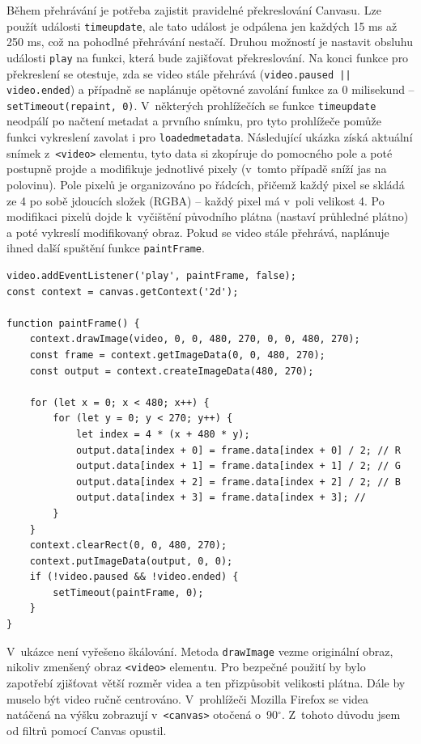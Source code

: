 Během přehrávání je potřeba zajistit pravidelné překreslování Canvasu. Lze použít události \texttt{timeupdate}, ale tato událost je odpálena jen každých 15 ms až 250 ms, což na pohodlné přehrávání nestačí. Druhou možností je nastavit obsluhu události \texttt{play} na funkci, která bude zajišťovat překreslování. Na konci funkce pro překreslení  se otestuje, zda se video stále přehrává (\texttt{video.paused || video.ended}) a případně se naplánuje opětovné zavolání funkce za 0 milisekund -- \texttt{setTimeout(repaint, 0)}. V~některých prohlížečích se funkce \texttt{timeupdate} neodpálí po načtení metadat a prvního snímku, pro tyto prohlížeče pomůže funkci vykreslení zavolat i pro \texttt{loadedmetadata}. Následující ukázka získá aktuální snímek z~\texttt{<video>} elementu, tyto data si zkopíruje do pomocného pole a poté postupně projde a modifikuje jednotlivé pixely (v~tomto případě sníží jas na polovinu). Pole pixelů je organizováno po řádcích, přičemž každý pixel se skládá ze 4 po sobě jdoucích složek (RGBA) -- každý pixel má v~poli velikost 4. Po modifikaci pixelů dojde k~vyčištění původního plátna (nastaví průhledné plátno) a poté vykreslí modifikovaný obraz. Pokud se video stále přehrává, naplánuje ihned další spuštění funkce \texttt{paintFrame}.
\begin{lstlisting}[style=JavaScript]
video.addEventListener('play', paintFrame, false);
const context = canvas.getContext('2d');

function paintFrame() {
    context.drawImage(video, 0, 0, 480, 270, 0, 0, 480, 270);
    const frame = context.getImageData(0, 0, 480, 270);
    const output = context.createImageData(480, 270);
    
    for (let x = 0; x < 480; x++) {
        for (let y = 0; y < 270; y++) {
            let index = 4 * (x + 480 * y);
            output.data[index + 0] = frame.data[index + 0] / 2; // R
            output.data[index + 1] = frame.data[index + 1] / 2; // G
            output.data[index + 2] = frame.data[index + 2] / 2; // B
            output.data[index + 3] = frame.data[index + 3]; //
        }
    }
    context.clearRect(0, 0, 480, 270);
    context.putImageData(output, 0, 0);
    if (!video.paused && !video.ended) {
        setTimeout(paintFrame, 0);
    }
}
\end{lstlisting}

V~ukázce není vyřešeno škálování. Metoda \texttt{drawImage} vezme originální obraz, nikoliv zmenšený obraz \texttt{<video>} elementu. Pro bezpečné použití by bylo zapotřebí zjišťovat větší rozměr videa a ten přizpůsobit velikosti plátna. Dále by muselo být video ručně centrováno. V~prohlížeči Mozilla Firefox se videa natáčená na výšku zobrazují v~\texttt{<canvas>} otočená o~90$^{\circ}$. Z~tohoto důvodu jsem od filtrů pomocí Canvas opustil.

